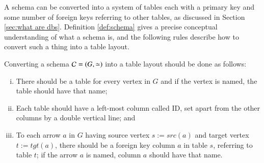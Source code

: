 A schema can be converted into a system of tables each with a primary key and some number of foreign keys referring to other tables, as discussed in Section \ref{sec:what are dbs}. Definition \ref{def:schema} gives a precise conceptual understanding of what a schema is, and the following rules describe how to convert such a thing into a table layout.

\begin{rules}\label{rules:schema to tables}

Converting a schema $\mathcal{C}=(G,\simeq)$ into a table layout should be done as follows:
\begin{enumerate}[(i)]
\item There should be a table for every vertex in $G$ and if the vertex is named, the table should have that name;
\item Each table should have a left-most column called ID, set apart from the other columns by a double vertical line; and
\item To each arrow $a$ in $G$ having source vertex $s:=src(a)$ and target vertex $t:=tgt(a)$, there should be a foreign key column $a$ in table $s$, referring to table $t$; if the arrow $a$ is named, column $a$ should have that name.
\end{enumerate}

\end{rules}

